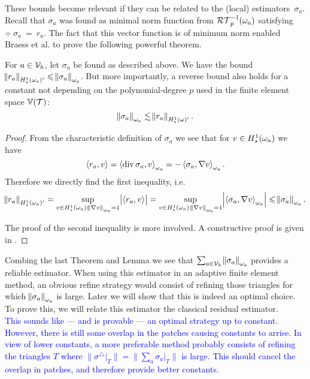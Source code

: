 \documentclass[thesis.tex]{subfiles}
\begin{document}
These bounds become relevant if they can be related to the (local) estimators~$\sigma_a$. Recall
that $\sigma_a$ was found as minimal norm function from $\mathcal{RT}_p^{-1}(\omega_a)$ satisfying $\div~\sigma_a~=~r_a$.
The fact that this vector function is of minimum norm enabled Braess et al. \cite{braessequilrobust} to prove the following powerful theorem.
\begin{thm}
  \label{thm:locresequiv}
  For $a \in \mathcal{V}_h$, let $\sigma_a$ be found as described above. 
  We have the bound $\norm{r_a}_{H_\star^1(\omega_a)'} \leqslant \norm{\sigma_a}_{\omega_a}$. But more importantly,
  a reverse bound also holds for a constant {not} depending on the polynomial-degree $p$ used in the finite element space $\mathbb{V}(\mathcal{T})$:
  \[
    \norm{\sigma_a}_{\omega_a} \lesssim \norm{r_a}_{H_\star^1(\omega)'}.
  \]
\end{thm}
\begin{proof}
  From the characteristic definition of $\sigma_a$ we see that for $v \in H_\star^1(\omega_a)$ we have
  \[
    \left \langle r_a, v \right \rangle = \left \langle \operatorname{div} \sigma_a, v \right \rangle_{\omega_a} = - \left \langle \sigma_a, \nabla v \right \rangle_{\omega_a}.
  \]
  Therefore we directly find the first inequality, i.e.
  \[
    \norm{r_a}_{H_\star^1(\omega_a)'} = \sup_{v \in H_\star^1(\omega_a) : \norm{\nabla v}_{\omega_a} = 1} \abs{\left \langle r_a, v \right \rangle} = \sup_{v \in H_\star^1(\omega_a) : \norm{\nabla v}_{\omega_a}=1} \abs{\left \langle \sigma_a, \nabla v \right \rangle_{\omega_a}} \leqslant \norm{\sigma_a}_{\omega_a}.
  \]

  The proof of the second inequality is more involved. A constructive proof is given in \cite[Theorem~7]{braessequilrobust}.
\end{proof}
\begin{rem}
  Combing the last Theorem and Lemma we see that $\sum_{a \in \mathcal{V}_h} \norm{\sigma_a}_{\omega_a}$ provides a reliable estimator.
  When using this estimator in an adaptive finite element method, an obvious refine strategy would consist
  of refining those triangles for which $\norm{\sigma_a}_{\omega_a}$ is large. Later we will show that this is indeed
  an optimal choice. To prove this, we will relate this estimator the classical residual estimator.
  \\
  \textcolor{blue}{
    This sounds like --- and is provable --- an optimal strategy up to constant. However, there is still some 
    overlap in the patches causing constants to arrise. In view of lower constants, a more preferable method probably consists of refining the triangles $T$
    where $\|{\sigma^\triangle|_{T}}\| =\|{\sum_{a} \sigma_a|_{T}}\|$ is large. This should cancel the overlap in patches,
    and therefore provide better constants.
  }
\end{rem}
\end{document}

